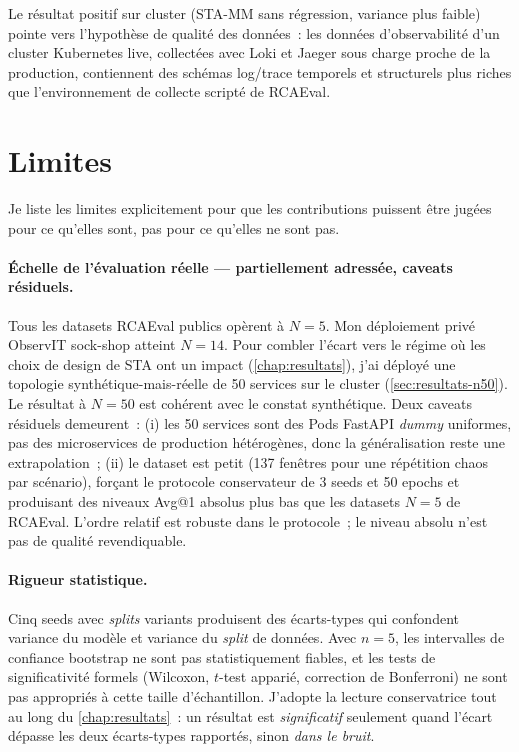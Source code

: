 \documentclass[a4paper,11pt,oneside]{report}
\begin{document}
Le r\'esultat positif sur cluster (STA-MM sans r\'egression, variance plus faible) pointe vers l'hypoth\`ese de qualit\'e des donn\'ees~: les donn\'ees d'observabilit\'e d'un cluster Kubernetes live, collect\'ees avec Loki et Jaeger sous charge proche de la production, contiennent des sch\'emas log/trace temporels et structurels plus riches que l'environnement de collecte script\'e de RCAEval.

\section{Limites}
\label{sec:disc-limites}

Je liste les limites explicitement pour que les contributions puissent \^etre jug\'ees pour ce qu'elles sont, pas pour ce qu'elles ne sont pas.

\paragraph{\'Echelle de l'\'evaluation r\'eelle --- partiellement adress\'ee, caveats r\'esiduels.} Tous les datasets RCAEval publics op\`erent \`a $N{=}5$. Mon d\'eploiement priv\'e ObservIT sock-shop atteint $N{=}14$. Pour combler l'\'ecart vers le r\'egime o\`u les choix de design de STA ont un impact (\cref{chap:resultats}), j'ai d\'eploy\'e une topologie synth\'etique-mais-r\'eelle de 50 services sur le cluster (\cref{sec:resultats-n50}). Le r\'esultat \`a $N{=}50$ est coh\'erent avec le constat synth\'etique. Deux caveats r\'esiduels demeurent~: (i) les 50 services sont des Pods FastAPI \emph{dummy} uniformes, pas des microservices de production h\'et\'erog\`enes, donc la g\'en\'eralisation reste une extrapolation~; (ii) le dataset est petit (137 fen\^etres pour une r\'ep\'etition chaos par sc\'enario), for\c{c}ant le protocole conservateur de 3 seeds et 50 epochs et produisant des niveaux Avg@1 absolus plus bas que les datasets $N{=}5$ de RCAEval. L'ordre relatif est robuste dans le protocole~; le niveau absolu n'est pas de qualit\'e revendiquable.

\paragraph{Rigueur statistique.} Cinq seeds avec \emph{splits} variants produisent des \'ecarts-types qui confondent variance du mod\`ele et variance du \emph{split} de donn\'ees. Avec $n{=}5$, les intervalles de confiance bootstrap ne sont pas statistiquement fiables, et les tests de significativit\'e formels (Wilcoxon, $t$-test appari\'e, correction de Bonferroni) ne sont pas appropri\'es \`a cette taille d'\'echantillon. J'adopte la lecture conservatrice tout au long du \cref{chap:resultats}~: un r\'esultat est \emph{significatif} seulement quand l'\'ecart d\'epasse les deux \'ecarts-types rapport\'es, sinon \emph{dans le bruit}.
\end{document}
